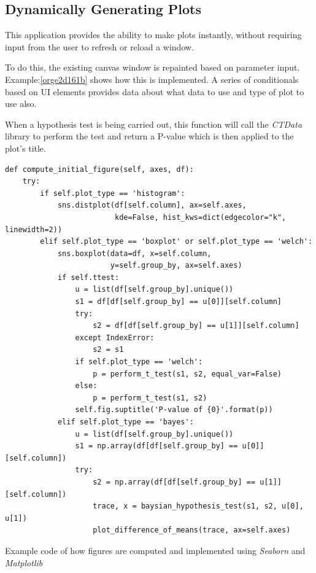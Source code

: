 \documentclass[11pt]{report}
\begin{document}
\subsection{Dynamically Generating Plots}
\label{sec:org5b411ca}
This application provides the ability to make plots instantly, without requiring input from the user to refresh or reload a window.

To do this, the existing canvas window is repainted based on parameter input. Example:\ref{orge2d161b}
shows how this is implemented. A series of conditionals based on UI elements provides data about what data to use and type of plot to use also.

When a hypothesis test is being carried out, this function will call the \emph{CTData} library to perform the test and return a P-value which is then applied to the plot's title.

\begin{listing}[htbp]
\begin{verbatim}
def compute_initial_figure(self, axes, df):
    try:
        if self.plot_type == 'histogram':
            sns.distplot(df[self.column], ax=self.axes,
                         kde=False, hist_kws=dict(edgecolor="k", linewidth=2))
        elif self.plot_type == 'boxplot' or self.plot_type == 'welch':
            sns.boxplot(data=df, x=self.column,
                        y=self.group_by, ax=self.axes)
            if self.ttest:
                u = list(df[self.group_by].unique())
                s1 = df[df[self.group_by] == u[0]][self.column]
                try:
                    s2 = df[df[self.group_by] == u[1]][self.column]
                except IndexError:
                    s2 = s1
                if self.plot_type == 'welch':
                    p = perform_t_test(s1, s2, equal_var=False)
                else:
                    p = perform_t_test(s1, s2)
                self.fig.suptitle('P-value of {0}'.format(p))
            elif self.plot_type == 'bayes':
                u = list(df[self.group_by].unique())
                s1 = np.array(df[df[self.group_by] == u[0]][self.column])
                try:
                    s2 = np.array(df[df[self.group_by] == u[1]][self.column])
                    trace, x = baysian_hypothesis_test(s1, s2, u[0], u[1])
                    plot_difference_of_means(trace, ax=self.axes)
\end{verbatim}
\caption{\label{orge2d161b}
Example code of how figures are computed and implemented using \emph{Seaborn} and \emph{Matplotlib}}
\end{listing}
\end{document}
